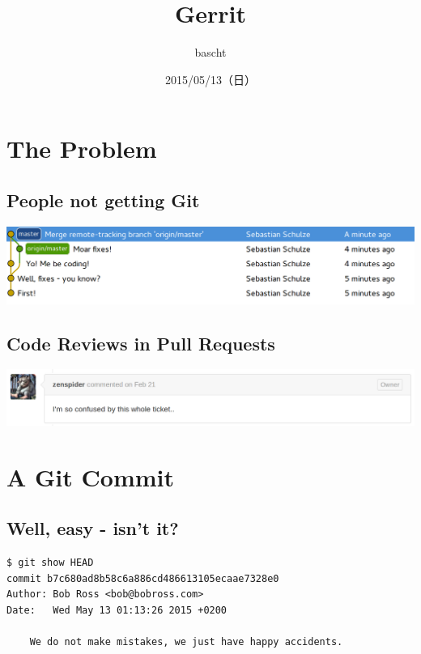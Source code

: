 \documentclass[11pt]{article}
\author{bascht}
\date{2015/05/13（日）}
\title{Gerrit}
\begin{document}
\maketitle

\section*{The Problem}
\label{sec-1}
\subsection*{People not getting Git}
\label{sec-1-1}
\begin{center}
\includegraphics[width=.9\linewidth]{images/merge-master.png}
\end{center}

\subsection*{Code Reviews in Pull Requests}
\label{sec-1-2}
\begin{center}
\includegraphics[width=.9\linewidth]{images/confused-ticket.png}
\end{center}

\section*{A Git Commit}
\label{sec-2}

\subsection*{Well, easy - isn't it?}
\label{sec-2-1}
\begin{verbatim}
$ git show HEAD
commit b7c680ad8b58c6a886cd486613105ecaae7328e0
Author: Bob Ross <bob@bobross.com>
Date:   Wed May 13 01:13:26 2015 +0200

    We do not make mistakes, we just have happy accidents.
\end{verbatim}
\end{document}
